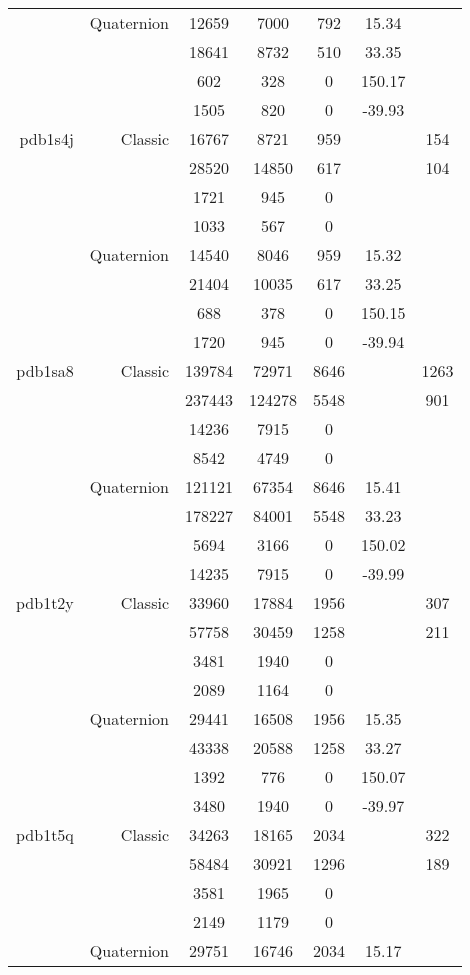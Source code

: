 \begin{xltabular}{\textwidth}{r|rcccSc}
& Quaternion & 12659 & 7000 & 792 & 15.34 & \\
& & 18641 & 8732 & 510 & 33.35 & \\
& & 602 & 328 & 0 & 150.17 & \\
& & 1505 & 820 & 0 & -39.93 & \\ \addlinespace
pdb1s4j & Classic & 16767 & 8721 & 959 & & 154 \\
& & 28520 & 14850 & 617 & & 104 \\
& & 1721 & 945 & 0 & & \\
& & 1033 & 567 & 0 & & \\
& Quaternion & 14540 & 8046 & 959 & 15.32 & \\
& & 21404 & 10035 & 617 & 33.25 & \\
& & 688 & 378 & 0 & 150.15 & \\
& & 1720 & 945 & 0 & -39.94 & \\ \addlinespace
pdb1sa8 & Classic & 139784 & 72971 & 8646 & & 1263 \\
& & 237443 & 124278 & 5548 & & 901 \\
& & 14236 & 7915 & 0 & & \\
& & 8542 & 4749 & 0 & & \\
& Quaternion & 121121 & 67354 & 8646 & 15.41 & \\
& & 178227 & 84001 & 5548 & 33.23 & \\
& & 5694 & 3166 & 0 & 150.02 & \\
& & 14235 & 7915 & 0 & -39.99 & \\ \addlinespace
pdb1t2y & Classic & 33960 & 17884 & 1956 & & 307 \\
& & 57758 & 30459 & 1258 & & 211 \\
& & 3481 & 1940 & 0 & & \\
& & 2089 & 1164 & 0 & & \\
& Quaternion & 29441 & 16508 & 1956 & 15.35 & \\
& & 43338 & 20588 & 1258 & 33.27 & \\
& & 1392 & 776 & 0 & 150.07 & \\
& & 3480 & 1940 & 0 & -39.97 & \\ \addlinespace
pdb1t5q & Classic & 34263 & 18165 & 2034 & & 322 \\
& & 58484 & 30921 & 1296 & & 189 \\
& & 3581 & 1965 & 0 & & \\
& & 2149 & 1179 & 0 & & \\
& Quaternion & 29751 & 16746 & 2034 & 15.17 & \\

\end{xltabular}
